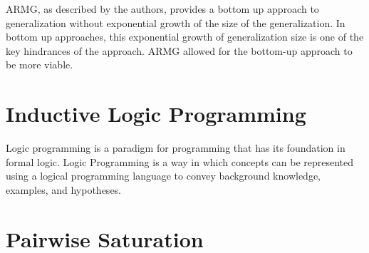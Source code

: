 \documentclass[jair,twoside,11pt,theapa]{article}
\begin{document}
ARMG, as described by the authors, provides a bottom up approach to generalization without exponential growth of the size of the generalization. In bottom up approaches, this exponential growth of generalization size is one of the key hindrances of the approach. ARMG allowed for the bottom-up approach to be more viable. 




\section{Inductive Logic Programming}
\label{background}
Logic programming is a paradigm for programming that has its foundation in formal logic. 
Logic Programming is a way in which concepts can be represented using a logical programming language to convey background knowledge, examples, and hypotheses. 


\section{Pairwise Saturation}

\vskip 0.2in


\end{document}
